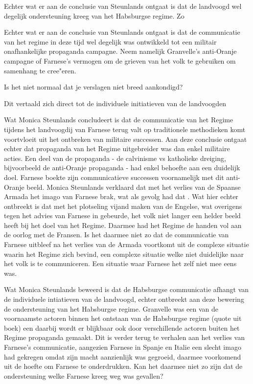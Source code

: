 \documentclass[11pt]{amsart}
\begin{document}
Echter wat er aan de conclusie van Steunlands ontgaat is dat de landvoogd wel degelijk ondersteuning kreeg van het
Habsburgse regime. Zo

Echter wat er aan de conclusie van Steunlands ontgaat is dat de communicatie van het regime in deze tijd wel degelijk
was ontwikkeld tot een militair onafhankelijke propaganda campagne. Neem namelijk Granvelle's anti-Oranje campagne of
Farnese's vermogen om de grieven van het volk te gebruiken om samenhang te cree"eren.

Is het niet normaal dat je verslagen niet breed aankondigd?

Dit vertaald zich direct tot de individuele initiatieven van de landvoogden

Wat Monica Steunlands concludeert is dat de communicatie van het Regime tijdens het landvoogdij van Farnese terug valt
op traditionele methodieken komt voortvloeit uit het ontbreken van militaire successen. Aan deze conclusie ontgaat
echter dat propaganda van het Regime uitgebreider was dan enkel militaire acties. Een deel van de propaganda - de
calvinisme vs katholieke dreiging, bijvoorbeeld de anti-Oranje propaganda - had enkel behoefte aan een duidelijk doel.
Farnese boekte zijn communicatieve successen voornamelijk met dit anti-Oranje beeld. Monica Steunlands verklaard dat
met het verlies van de Spaanse Armada het imago van Farnese brak, wat als gevolg had dat . Wat hier echter ontbreekt is
dat met het plotseling vijand maken van de Engelse, wat overigens tegen het advies van Farnese in gebeurde, het volk
niet langer een helder beeld heeft bij het doel van het Regime. Daarmee had het Regime de handen vol aan de oorlog met
de Fransen. Is het daarmee niet zo dat de communicatie van Farnese uitbleef na het verlies van de Armada voortkomt uit
de complexe situatie waarin het Regime zich bevind, een complexe situatie welke niet duidelijke naar het volk is te
communiceren. Een situatie waar Farnese het zelf niet mee eens was.

Wat Monica Steunlands beweerd is dat de Habsburgse communicatie afhangt van de individuele intiatieven van de
landvoogd, echter ontbreekt aan deze bewering de ondersteuning van het Habsburgse regime. Granvelle was een van de
voornaamste actoren binnen het ontstaan van de Habsburgse regime (quote uit boek) een daarbij wordt er blijkbaar ook
door verschillende actoren buiten het Regime propaganda gemaakt. Dit is verder terug te verhalen aan het verlies van
Farnese's communicatie, aangezien Farnese in Spanje en Italie een slecht imago had gekregen omdat zijn macht
aanzienlijk was gegroeid, daarmee voorkomend uit de hoefte om Farnese te onderdrukken. Kan het daarmee niet zo zijn dat
de ondersteuning welke Farnese kreeg weg was gevallen?
\end{document}
